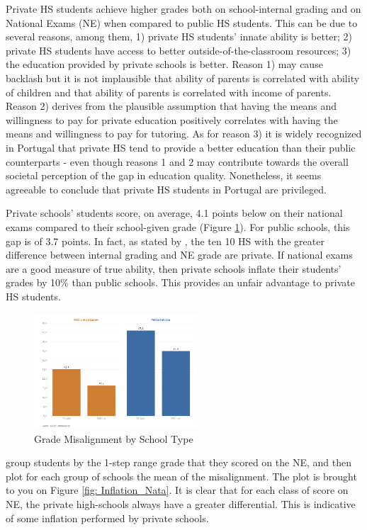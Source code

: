\documentclass{article}
\begin{document}
Private HS students achieve higher grades both on school-internal grading and on National Exams (NE) when compared to public HS students. This can be due to several reasons, among them, 1) private HS students' innate ability is better; 2) private HS students have access to better outside-of-the-classroom resources; 3) the education provided by private schools is better. Reason 1) may cause backlash but it is not implausible that ability of parents is correlated with ability of children and that ability of parents is correlated with income of parents. Reason 2) derives from the plausible assumption that having the means and willingness to pay for private education positively correlates with having the means and willingness to pay for tutoring. As for reason 3) it is widely recognized in Portugal that private HS tend to provide a better education than their public counterparts - even though reasons 1 and 2 may contribute towards the overall societal perception of the gap in education quality.
Nonetheless, it seems agreeable to conclude that private HS students in Portugal are privileged. 

Private schools' students score, on average, 4.1 points below on their national exams compared to their school-given grade (Figure \ref{fig: InflationBySchoolType}). For public schools, this gap is of 3.7 points. In fact, as stated by \cite{sapo2024}, the ten 10 HS with the greater difference between internal grading and NE grade are private.
If national exams are a good measure of true ability, then private schools inflate their students' grades by 10\% than public schools. This provides an unfair advantage to private HS students.

\begin{figure}[ht]
  \centering
  \includegraphics[height=4.3cm, keepaspectratio]{Figures/InflationBySchoolType.png}
  \caption{Grade Misalignment by School Type \citep{sapo2024}}
  \label{fig: InflationBySchoolType}
\end{figure}



\cite{nata2014unfairness} group students by the 1-step range grade that they scored on the NE, and then plot for each group of schools the mean of the misalignment. The plot is brought to you on Figure \ref{fig: Inflation_Nata}. It is clear that for each class of score on NE, the private high-schools always have a greater differential. This is indicative of some inflation performed by private schools. 
\end{document}
